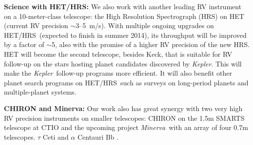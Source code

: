 \documentclass[12pt]{article}
\def\mps{m/s}
\def\kepler{{\it Kepler}}
\def\minerva{{\it Minerva}}
\def\hrs{HET/HRS}
\begin{document}
\textbf{Science with \hrs: } We also work with another leading RV
instrument on a 10-meter-class telescope: the High Resolution
Spectrograph (HRS) on HET (current RV precision $\sim$3--5~\mps). With
multiple ongoing upgrades on \hrs\ (expected to finish in summer
2014), its throughput will be improved by a factor of $\sim$5, also
with the promise of a higher RV precision of the new HRS. HET will
become the second telescope, besides Keck, that is suitable for RV
follow-up on the stars hosting planet candidates discovered by
\kepler. This will make the \kepler\ follow-up programs more
efficient. It will also benefit other planet search programs on
\hrs\ such as surveys on long-period planets and multiple-planet
systems.

\textbf{CHIRON and Minerva: } Our work also has great synergy with two
very high RV precision instruments on smaller telescopes: CHIRON on
the 1.5m SMARTS telescope at CTIO and the upcoming project \minerva\
with an array of four 0.7m telescopes. $\tau$ Ceti \citep{tuomi2013}
and $\alpha$ Centauri Bb \citep{dumusque2012,hatzes2013}.

\vspace{-3pt}
\end{document}

